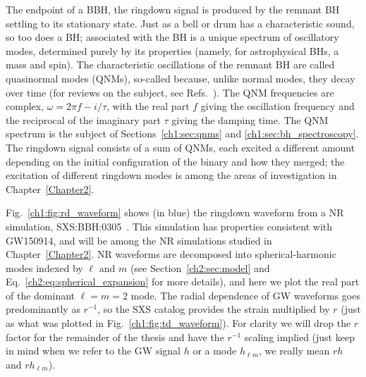 The endpoint of a BBH, the ringdown signal is produced by the remnant BH settling to its stationary state.
Just as a bell or drum has a characteristic sound, so too does a BH; associated with the BH is a unique spectrum of oscillatory modes, determined purely by its properties (namely, for astrophysical BHs, a mass and spin).
The characteristic oscillations of the remnant BH are called quasinormal modes (QNMs), so-called because, unlike normal modes, they decay over time (for reviews on the subject, see Refs.~\cite{Kokkotas:1999bd, Nollert:1999ji, Ferrari:2007dd, Berti:2009kk}).
The QNM frequencies are complex, $\omega = 2\pi f - i/\tau$, with the real part $f$ giving the oscillation frequency and the reciprocal of the imaginary part $\tau$ giving the damping time. 
The QNM spectrum is the subject of Sections~\ref{ch1:sec:qnms} and \ref{ch1:sec:bh_spectroscopy}.
The ringdown signal consists of a sum of QNMs, each excited a different amount depending on the initial configuration of the binary and how they merged; the excitation of different ringdown modes is among the areas of investigation in Chapter~\ref{Chapter2}.

Fig.~\ref{ch1:fig:rd_waveform} shows (in blue) the ringdown waveform from a NR simulation, SXS:BBH:0305~\cite{Lovelace:2016uwp}.
This simulation has properties consistent with GW150914, and will be among the NR simulations studied in Chapter~\ref{Chapter2}.
NR waveforms are decomposed into spherical-harmonic modes indexed by $\ell$ and $m$ (see Section~\ref{ch2:sec:model} and Eq.~\ref{ch2:eq:spherical_expansion} for more details), and here we plot the real part of the dominant $\ell = m = 2$ mode.
The radial dependence of GW waveforms goes predominantly as $r^{-1}$, so the SXS catalog provides the strain multiplied by $r$ (just as what was plotted in Fig.~\ref{ch1:fig:td_waveform}).
For clarity we will drop the $r$ factor for the remainder of the thesis and have the $r^{-1}$ scaling implied (just keep in mind when we refer to the GW signal $h$ or a mode $h_{\ell m}$, we really mean $rh$ and $rh_{\ell m}$). 

